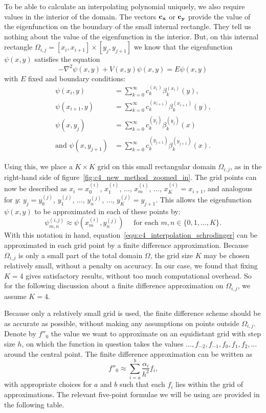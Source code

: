 To be able to calculate an interpolating polynomial uniquely, we also require values in the interior of the domain. The vectors $\vb{c_x}$ or $\vb{c_y}$ provide the value of the eigenfunction on the boundary of the small internal rectangle. They tell us nothing about the value of the eigenfunction in the interior. But, on this internal rectangle $\Omega_{i, j} = [x_i, x_{i+1}] \times [y_j, y_{j+1}]$ we know that the eigenfunction $\psi(x, y)$ satisfies the equation
\begin{equation}\label{equ:c4_interpolation_schrodinger}
    -\nabla^2 \psi(x, y) + V(x, y) \psi(x, y) = E \psi(x, y)
\end{equation}
with $E$ fixed and boundary conditions:
\begin{align*}
    \psi(x_i, y)                 & = \sum_{k=0}^\infty c_k^{(x_i)} \beta_k^{(x_i)}(y)\text{,}          \\
    \psi(x_{i+1}, y)             & = \sum_{k=0}^\infty c_k^{(x_{i+1})} \beta_k^{(x_{i+1})}(y)\text{,}  \\
    \psi(x, y_j)                 & = \sum_{k=0}^\infty c_k^{(y_j)} \beta_k^{(y_j)}(x)                  \\
    \text{and } \psi(x, y_{j+1}) & = \sum_{k=0}^\infty c_k^{(y_{j+1})} \beta_k^{(y_{j+1})}(x) \text{.}
\end{align*}

Using this, we place a $K \times K$ grid on this small rectangular domain $\Omega_{i, j}$, as in the right-hand side of figure~\ref{fig:c4_new_method_zoomed_in}. The grid points can now be described as $x_i = x^{(i)}_0$, $x^{(i)}_1$, $\dots$, $x^{(i)}_m$, $\dots$, $x^{(i)}_K = x_{i+1}$, and analogous for $y$: $y_j = y^{(j)}_0$, $y^{(j)}_1$, $\dots$, $y^{(j)}_n$, $\dots$, $y^{(j)}_K = y_{j+1}$. This allows the eigenfunction $\psi(x, y)$ to be approximated in each of these points by:
$$
    \psi^{(i,j)}_{m,n} \approx \psi(x^{(i)}_m, y^{(j)}_n) \quad \text{ for each $m, n \in \{0, 1, \dots, K\}$.}
$$
With this notation in hand, equation~\ref{equ:c4_interpolation_schrodinger} can be approximated in each grid point by a finite difference approximation. Because $\Omega_{i,j}$ is only a small part of the total domain $\Omega$, the grid size $K$ may be chosen relatively small, without a penalty on accuracy. In our case, we found that fixing $K = 4$ gives satisfactory results, without too much computational overhead. So for the following discussion about a finite difference approximation on $\Omega_{i,j}$, we assume $K = 4$.

Because only a relatively small grid is used, the finite difference scheme should be as accurate as possible, without making any assumptions on points outside $\Omega_{i,j}$. Denote by $f''_0$ the value we want to approximate on an equidistant grid with step size $h$, on which the function in question takes the values $\dots, f_{-2}, f_{-1}, f_{0}, f_{1}, f_{2}, \dots$ around the central point. The finite difference approximation can be written as
$$
    f''_0 \approx \sum_{i = a}^{b} \frac{\alpha_i}{h^2} f_i\text{,}
$$
with appropriate choices for $a$ and $b$ such that each $f_i$ lies within the grid of approximations. The relevant five-point formulae we will be using are provided in the following table.

